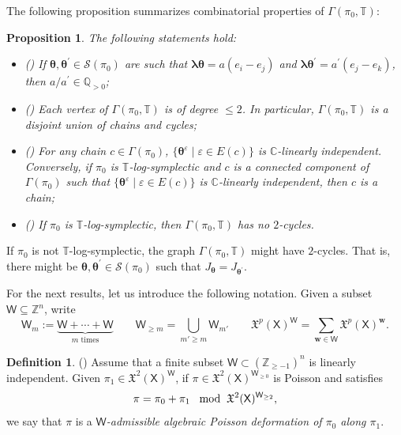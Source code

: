 \documentclass[11pt]{article}
\newcommand{\blambda}{\boldsymbol{\lambda}}
\newcommand{\btheta}{{\boldsymbol{\theta}}}
\newtheorem{proposition}[theorem]{Proposition}%
\theoremstyle{definition}\newtheorem{definition}[theorem]{Definition}
\theoremstyle{definition}\newtheorem{remark}[theorem]{Remark}
\theoremstyle{remark}
\numberwithin{equation}{section}
\begin{document}
The following proposition summarizes combinatorial properties of $\Gamma(\pi_0,\mathbb{T})$:
\begin{proposition}\label{p:lm_bunch}
    The following statements hold:
    \begin{itemize}
        \item (\cite[Lemma 2.2.9]{lm-deform}) If $\btheta, \btheta^\prime \in \mathcal{S}(\pi_0)$ are such that $\blambda \btheta = a(e_i-e_j)$ and $\blambda \btheta^\prime = a^\prime(e_j-e_k)$, then $a/a^\prime \in \mathbb{Q}_{> 0}$; 
        \item (\cite[Lemma 2.2.10]{lm-deform}) Each vertex of $\Gamma(\pi_0,\mathbb{T})$ is of degree $\leq 2$. In particular, $\Gamma(\pi_0,\mathbb{T})$ is a disjoint union of chains and cycles;
        \item (\cite[Lemma-Definition 2.2.12]{lm-deform}) For any chain $c \in \Gamma(\pi_0)$, $\{\btheta^{\varepsilon} \mid \varepsilon \in E(c)\}$ is $\mathbb{C}$-linearly independent. Conversely, if $\pi_0$ is $\mathbb{T}$-log-symplectic and $c$ is a connected component of $\Gamma(\pi_0)$ such that $\{\btheta^{\varepsilon} \mid \varepsilon \in E(c)\}$ is $\mathbb{C}$-linearly independent, then $c$ is a chain;
        \item (\cite[Lemma 2.2.6]{lm-deform}) If $\pi_0$ is $\mathbb{T}$-log-symplectic, then $\Gamma(\pi_0,\mathbb{T})$ has no $2$-cycles.
    \end{itemize}
\end{proposition}
If $\pi_0$ is not $\mathbb{T}$-log-symplectic, the graph $\Gamma(\pi_0,\mathbb{T})$ might have $2$-cycles. That is, there might be $\btheta,\btheta^\prime \in \mathcal{S}(\pi_0)$ such that $J_{\btheta} = J_{\btheta^\prime}$.

For the next results, let us introduce the following notation. Given a subset $\mathsf{W} \subseteq \mathbb{Z}^n$, write
\begin{equation*}
    \mathsf{W}_m := \underbrace{\mathsf{W}+\cdots +\mathsf{W}}_{m \text{ times}} \qquad \mathsf{W}_{\geq m}=\bigcup_{m'\geq m}\mathsf{W}_{m'} \qquad \mathfrak{X}^p(\mathsf{X})^{\mathsf{W}} = \sum_{\mathbf{w}\in\mathsf{W}}
\mathfrak{X}^p(\mathsf{X})^{\mathbf{w}}.
\end{equation*}
\begin{definition}\label{def:S-adm}(\cite[Definition 3.2.1]{lm-deform}) 
Assume that a finite subset $\mathsf{W} \subset (\mathbb{Z}_{\geq -1})^n$ is linearly independent. Given $\pi_1\in \mathfrak{X}^2(\mathsf{X})^{\mathsf{W} }$, if 
$\pi\in \mathfrak{X}^2(\mathsf{X})^{\mathsf{W} _{\geq 0}}$ is Poisson and satisfies
\[
\pi=\pi_0+\pi_1\;\;\;{\rm mod}\;\;\mathfrak{X}^2(\mathsf{X})^{\mathsf{W} _{\geq 2}},
\]
we say that $\pi$ is a {\it $\mathsf{W}$-admissible algebraic Poisson deformation of $\pi_0$ along $\pi_1$}.
\end{definition}
\end{document}

